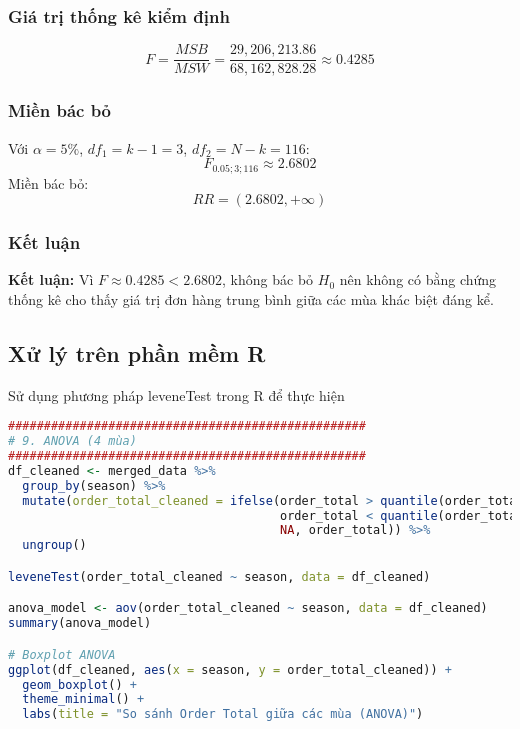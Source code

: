 \subsubsection{Giá trị thống kê kiểm định}
\[
F = \frac{MSB}{MSW} = \frac{29,206,213.86}{68,162,828.28} \approx 0.4285
\]

\subsubsection{Miền bác bỏ}
Với $\alpha = 5\%$, $df_1 = k-1 = 3$, $df_2 = N-k = 116$:
\[
F_{0.05; 3; 116} \approx 2.6802
\]
Miền bác bỏ:
\[
RR = (2.6802, +\infty)
\]

\subsubsection{Kết luận}
\begin{boxH}

\textbf{Kết luận:} 
Vì $F \approx 0.4285 < 2.6802$, không bác bỏ $H_0$ nên không có bằng chứng thống kê cho thấy giá trị đơn hàng trung bình giữa các mùa khác biệt đáng kể.

\end{boxH}

\subsection{Xử lý trên phần mềm R}
Sử dụng phương pháp leveneTest trong R để thực hiện
\begin{lstlisting}[language=R, caption=Phép kiểm ANOVA một yếu tố]
##################################################
# 9. ANOVA (4 mùa)
##################################################
df_cleaned <- merged_data %>%
  group_by(season) %>%
  mutate(order_total_cleaned = ifelse(order_total > quantile(order_total, 0.75) + 1.5 * IQR(order_total) |
                                      order_total < quantile(order_total, 0.25) - 1.5 * IQR(order_total),
                                      NA, order_total)) %>%
  ungroup()

leveneTest(order_total_cleaned ~ season, data = df_cleaned)

anova_model <- aov(order_total_cleaned ~ season, data = df_cleaned)
summary(anova_model)

# Boxplot ANOVA
ggplot(df_cleaned, aes(x = season, y = order_total_cleaned)) +
  geom_boxplot() +
  theme_minimal() +
  labs(title = "So sánh Order Total giữa các mùa (ANOVA)")

\end{lstlisting}

